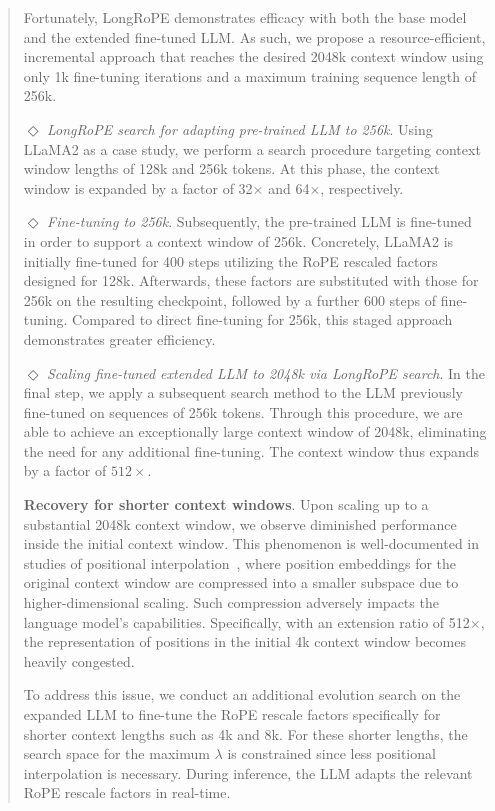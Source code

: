 \begin{abstract}
Fortunately, LongRoPE demonstrates efficacy with both the base model and the extended fine-tuned LLM. As such, we propose a resource-efficient, incremental approach that reaches the desired 2048k context window using only 1k fine-tuning iterations and a maximum training sequence length of 256k.

$\Diamond$ \textit{LongRoPE search for adapting pre-trained LLM to 256k}. Using LLaMA2 as a case study, we perform a search procedure targeting context window lengths of 128k and 256k tokens. At this phase, the context window is expanded by a factor of 32$\times$ and 64$\times$, respectively.

$\Diamond$ \textit{Fine-tuning to 256k}. Subsequently, the pre-trained LLM is fine-tuned in order to support a context window of 256k. Concretely, LLaMA2 is initially fine-tuned for 400 steps utilizing the RoPE rescaled factors designed for 128k. Afterwards, these factors are substituted with those for 256k on the resulting checkpoint, followed by a further 600 steps of fine-tuning. Compared to direct fine-tuning for 256k, this staged approach demonstrates greater efficiency.

$\Diamond$ \textit{Scaling fine-tuned extended LLM to 2048k via LongRoPE search}. In the final step, we apply a subsequent search method to the LLM previously fine-tuned on sequences of 256k tokens. Through this procedure, we are able to achieve an exceptionally large context window of 2048k, eliminating the need for any additional fine-tuning. The context window thus expands by a factor of $512\times$.

\textbf{Recovery for shorter context windows}. Upon scaling up to a substantial 2048k context window, we observe diminished performance inside the initial context window. This phenomenon is well-documented in studies of positional interpolation~\cite{pi}, where position embeddings for the original context window are compressed into a smaller subspace due to higher-dimensional scaling. Such compression adversely impacts the language model's capabilities. Specifically, with an extension ratio of 512$\times$, the representation of positions in the initial 4k context window becomes heavily congested.

To address this issue, we conduct an additional evolution search on the expanded LLM to fine-tune the RoPE rescale factors specifically for shorter context lengths such as 4k and 8k. For these shorter lengths, the search space for the maximum $\lambda$ is constrained since less positional interpolation is necessary. During inference, the LLM adapts the relevant RoPE rescale factors in real-time.


\end{abstract}
